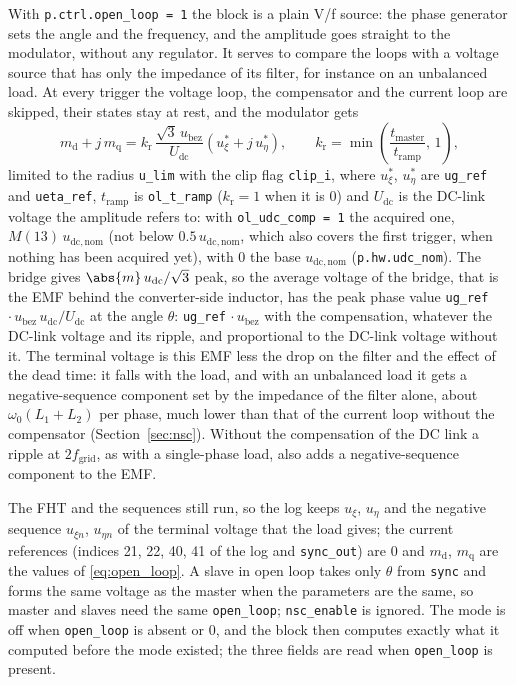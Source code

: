 \documentclass[11pt,a4paper]{scrartcl}
\newcommand{\ped}[1]{_{\mathrm{#1}}}
\newcommand{\code}[1]{\texttt{#1}}
\begin{document}
\begin{onehalfspace}
With \code{p.ctrl.open\_loop = 1} the block is a plain V/f source: the phase generator sets the angle and the frequency, and the amplitude goes straight to the modulator, without any regulator. It serves to compare the loops with a voltage source that has only the impedance of its filter, for instance on an unbalanced load. At every trigger the voltage loop, the compensator and the current loop are skipped, their states stay at rest, and the modulator gets
\begin{equation}
	m\ped{d} + j\, m\ped{q} = k\ped{r}\, \frac{\sqrt{3}\, u\ped{bez}}{U\ped{dc}} \left(u^{*}_\xi + j\, u^{*}_\eta\right),
	\qquad k\ped{r} = \min\!\left(\frac{t\ped{master}}{t\ped{ramp}},\, 1\right),
	\label{eq:open_loop}
\end{equation}
limited to the radius \code{u\_lim} with the clip flag \code{clip\_i}, where $u^{*}_\xi$, $u^{*}_\eta$ are \code{ug\_ref} and \code{ueta\_ref}, $t\ped{ramp}$ is \code{ol\_t\_ramp} ($k\ped{r} = 1$ when it is 0) and $U\ped{dc}$ is the DC-link voltage the amplitude refers to: with \code{ol\_udc\_comp = 1} the acquired one, $M(13)\, u\ped{dc,nom}$ (not below $0.5\, u\ped{dc,nom}$, which also covers the first trigger, when nothing has been acquired yet), with 0 the base $u\ped{dc,nom}$ (\code{p.hw.udc\_nom}). The bridge gives $\abs{m}\, u\ped{dc}/\sqrt{3}$ peak, so the average voltage of the bridge, that is the EMF behind the converter-side inductor, has the peak phase value \code{ug\_ref} $\cdot\, u\ped{bez}\, u\ped{dc}/U\ped{dc}$ at the angle $\theta$: \code{ug\_ref} $\cdot\, u\ped{bez}$ with the compensation, whatever the DC-link voltage and its ripple, and proportional to the DC-link voltage without it. The terminal voltage is this EMF less the drop on the filter and the effect of the dead time: it falls with the load, and with an unbalanced load it gets a negative-sequence component set by the impedance of the filter alone, about $\omega\ped{0} (L\ped{1} + L\ped{2})$ per phase, much lower than that of the current loop without the compensator (Section~\ref{sec:nsc}). Without the compensation of the DC link a ripple at $2 f\ped{grid}$, as with a single-phase load, also adds a negative-sequence component to the EMF.

The FHT and the sequences still run, so the log keeps $u_\xi$, $u_\eta$ and the negative sequence $u_{\xi n}$, $u_{\eta n}$ of the terminal voltage that the load gives; the current references (indices 21, 22, 40, 41 of the log and \code{sync\_out}) are 0 and $m\ped{d}$, $m\ped{q}$ are the values of \eqref{eq:open_loop}. A slave in open loop takes only $\theta$ from \code{sync} and forms the same voltage as the master when the parameters are the same, so master and slaves need the same \code{open\_loop}; \code{nsc\_enable} is ignored. The mode is off when \code{open\_loop} is absent or 0, and the block then computes exactly what it computed before the mode existed; the three fields are read when \code{open\_loop} is present.


\end{onehalfspace}
\end{document}
